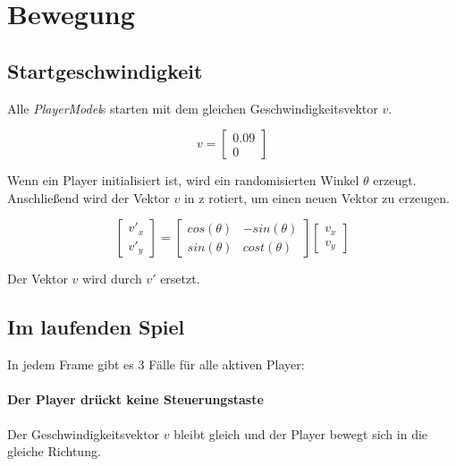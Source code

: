 \documentclass[doktyp=studarbeit]{TUBAFarbeiten}
\begin{document}
\section{Bewegung}

\subsection{Startgeschwindigkeit}

Alle \textit{PlayerModel}s starten mit dem gleichen 
Geschwindigkeitsvektor $v$.

\begin{equation}
    v =
    \begin{bmatrix}
        0.09    \\
        0
    \end{bmatrix}
\end{equation}

Wenn ein Player initialisiert ist, wird ein randomisierten Winkel $\theta$ 
erzeugt. Anschließend wird der Vektor $v$ in z rotiert, um einen neuen Vektor zu 
erzeugen.

\begin{equation}
    \begin{bmatrix}
        v'_{x} \\
        v'_{y}     
    \end{bmatrix}
    =
    \begin{bmatrix}
        cos(\theta) & -sin(\theta) \\
        sin(\theta) & cost(\theta)
    \end{bmatrix}
    \begin{bmatrix}
        v_{x} \\
        v_{y}
    \end{bmatrix}
    \label{eq:rotation}
\end{equation}

Der Vektor $v$ wird durch $v'$ ersetzt.

\subsection{Im laufenden Spiel}
In jedem Frame gibt es 3 Fälle für alle aktiven Player:

\paragraph{Der Player drückt keine Steuerungstaste}
Der Geschwindigkeitsvektor $v$ bleibt gleich und der Player bewegt sich
in die gleiche Richtung.
\end{document}
